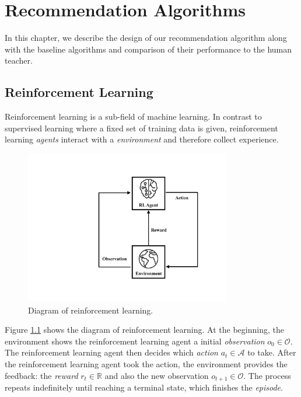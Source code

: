 
\chapter{Recommendation Algorithms}

    In this chapter, we describe the design of our recommendation algorithm
    along with the baseline algorithms and comparison of their performance to the human teacher.

\section{Reinforcement Learning}

    Reinforcement learning is a sub-field of machine learning.
    In contrast to supervised learning where a fixed set of training data is given,
    reinforcement learning \emph{agents} interact with a \emph{environment} and therefore collect experience.

    \begin{figure}[!htp]
        \centering
        \includegraphics[width=0.8\textwidth]{img/rl.pdf}
        \caption{Diagram of reinforcement learning.}
        \label{fig:rl}
    \end{figure}

    Figure \ref{fig:rl} shows the diagram of reinforcement learning.
    At the beginning, the environment shows the reinforcement learning agent
    a initial \emph{observation} $o_0 \in \mathcal{O}$.
    The reinforcement learning agent then decides which \emph{action} $a_t \in \mathcal{A}$ to take.
    After the reinforcement learning agent took the action,
    the environment provides the feedback: the \emph{reward} $r_t \in \mathbb{R}$
    and also the new observation $o_{t+1} \in \mathcal{O}$.
    The process repeats indefinitely until reaching a terminal state,
    which finishes the \emph{episode}.

